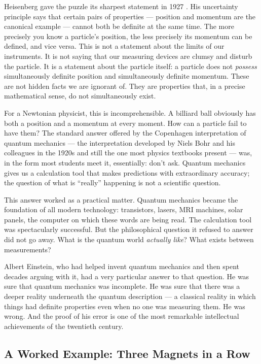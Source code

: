 Heisenberg gave the puzzle its sharpest statement in 1927 \citep{Heisenberg1927}. His uncertainty principle says that certain pairs of properties --- position and momentum are the canonical example --- cannot both be definite at the same time. The more precisely you know a particle's position, the less precisely its momentum can be defined, and vice versa. This is not a statement about the limits of our instruments. It is not saying that our measuring devices are clumsy and disturb the particle. It is a statement about the particle itself: a particle does not \emph{possess} simultaneously definite position and simultaneously definite momentum. These are not hidden facts we are ignorant of. They are properties that, in a precise mathematical sense, do not simultaneously exist.

For a Newtonian physicist, this is incomprehensible. A billiard ball obviously has both a position and a momentum at every moment. How can a particle fail to have them? The standard answer offered by the Copenhagen interpretation of quantum mechanics --- the interpretation developed by Niels Bohr and his colleagues in the 1920s and still the one most physics textbooks present --- was, in the form most students meet it, essentially: don't ask. Quantum mechanics gives us a calculation tool that makes predictions with extraordinary accuracy; the question of what is ``really'' happening is not a scientific question.

This answer worked as a practical matter. Quantum mechanics became the foundation of all modern technology: transistors, lasers, MRI machines, solar panels, the computer on which these words are being read. The calculation tool was spectacularly successful. But the philosophical question it refused to answer did not go away. What is the quantum world \emph{actually like}? What exists between measurements?

Albert Einstein, who had helped invent quantum mechanics and then spent decades arguing with it, had a very particular answer to that question. He was sure that quantum mechanics was incomplete. He was sure that there was a deeper reality underneath the quantum description --- a classical reality in which things had definite properties even when no one was measuring them. He was wrong. And the proof of his error is one of the most remarkable intellectual achievements of the twentieth century.

\subsection*{A Worked Example: Three Magnets in a Row}

